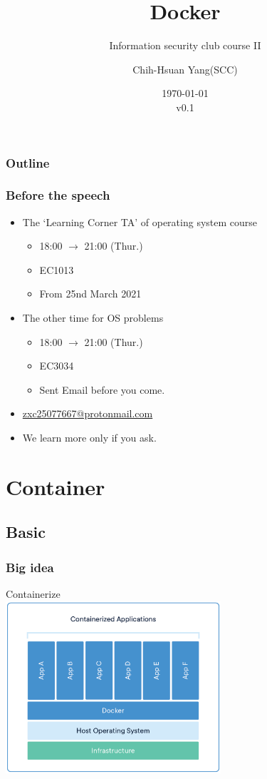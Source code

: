\documentclass{beamer}
\title{Docker}
\subtitle{Information security club course \RN{2}}
\author{Chih-Hsuan Yang(SCC)}
\institute{National Sun Yat-sen University}
\date{\today\\v0.1}
\begin{document}
\begin{frame}
    \titlepage
\end{frame}

\begin{frame}
    \frametitle{Outline}
    \tableofcontents
\end{frame}

\begin{frame}
    \frametitle{Before the speech}
    \begin{itemize}
        \item The `Learning Corner TA' of operating system course
              \begin{itemize}
                  \item 18:00 $\to$ 21:00 (Thur.)
                  \item EC1013
                  \item From 25nd March 2021
              \end{itemize}
        \item The other time for OS problems
              \begin{itemize}
                  \item 18:00 $\to$ 21:00 (Thur.)
                  \item EC3034
                  \item Sent Email before you come.
              \end{itemize}
        \item {\color{blue}\href{mailto::zxc25077667@protonmail.com}{zxc25077667@protonmail.com}}
        \item We learn more only if you ask.
    \end{itemize}
\end{frame}

\section{Container}
\subsection{Basic}
\begin{frame}
    \frametitle{Big idea}
    \centering
    Containerize\\
    \includegraphics[width=0.6\textwidth]{docker_what_is_container.png}\\
    \cite{What_is_container}
\end{frame}
\end{document}
